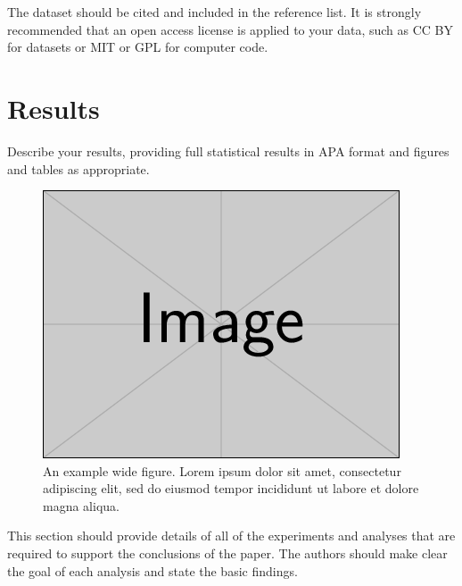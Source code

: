 \documentclass[a4paper,num-refs]{ehi-journals}
\begin{document}
The dataset should be cited and included in the reference list. It is strongly recommended that an open access license is applied to your data, such as CC BY for datasets or MIT or GPL for computer code.

\section{Results}

Describe your results, providing full statistical results in APA format and figures and tables as appropriate.

\begin{figure}%
\centering
\includegraphics[width=.7\textwidth]{example-image}
\caption{An example wide figure. Lorem ipsum dolor sit amet, consectetur adipiscing elit, sed do eiusmod tempor incididunt ut labore et dolore magna aliqua.
}\label{fig:example:wide}
\end{figure}

This section should provide details of all of the experiments and analyses that are required to support the conclusions of the paper. The authors should make clear the goal of each analysis and state the basic findings.
\end{document}
